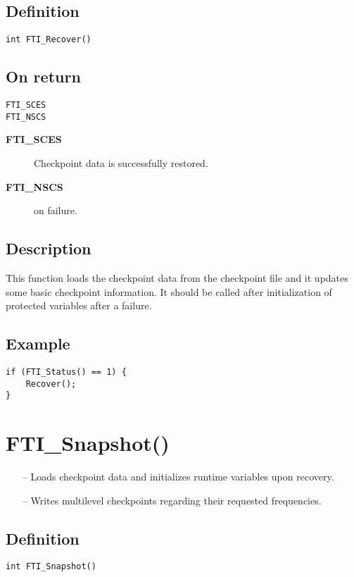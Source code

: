 \documentclass{refrep}
\begin{document}
\subsection*{Definition}
\begin{lstlisting}[frame=single]
int FTI_Recover()
\end{lstlisting}
\subsection*{On return}
\begin{lstlisting}[frame=single]
FTI_SCES
FTI_NSCS
\end{lstlisting}
\begin{description}
\item[\textbf{FTI\_SCES}] Checkpoint data is successfully restored.
\item[\textbf{FTI\_NSCS}] on failure.
\end{description}
\subsection*{Description}
This function loads the checkpoint data from the checkpoint file and it updates some basic checkpoint information. It should be called after initialization of protected variables after a failure.
\subsection*{Example}
\begin{center}
\begin{lstlisting}[frame=single]
if (FTI_Status() == 1) {
    Recover();
}
\end{lstlisting}
\end{center}
\newpage
\section{\asciifamily FTI\_Snapshot()}\label{sec:ftisnapshot}
\begin{framed}
\begin{itemize}
\item[--] Loads checkpoint data and initializes runtime variables upon recovery.
\item[--] Writes multilevel checkpoints regarding their requested frequencies.
\end{itemize}
\end{framed}
\subsection*{Definition}
\begin{lstlisting}[frame=single]
int FTI_Snapshot()
\end{lstlisting}
\end{document}

